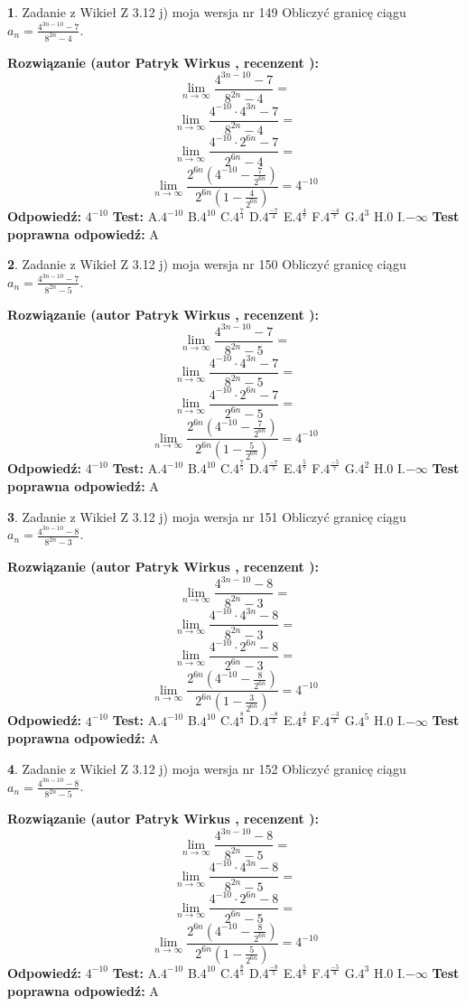 \documentclass[12pt, a4paper]{article}
\theoremstyle{definition} %
\newtheorem{zad}{}
\newcommand{\zadStart}[1]{\begin{zad}#1\newline}
\newcommand{\zadStop}{\end{zad}}
\newcommand{\rozwStart}[2]{\noindent \textbf{Rozwiązanie (autor #1 , recenzent #2): }\newline}
\newcommand{\rozwStop}{\newline}
\newcommand{\odpStart}{\noindent \textbf{Odpowiedź:}\newline}
\newcommand{\odpStop}{\newline}
\newcommand{\testStart}{\noindent \textbf{Test:}\newline}
\newcommand{\testStop}{\newline}
\newcommand{\kluczStart}{\noindent \textbf{Test poprawna odpowiedź:}\newline}
\newcommand{\kluczStop}{\newline}
\begin{document}
\zadStart{Zadanie z Wikieł Z 3.12 j) moja wersja nr 149}
Obliczyć granicę ciągu $a_{n}=\frac{4^{3n-10}-7}{8^{2n}-4}$.
\zadStop
\rozwStart{Patryk Wirkus}{}
$$\lim\limits_{n\to\infty}\frac{4^{3n-10}-7}{8^{2n}-4}=$$
$$\lim\limits_{n\to\infty}\frac{4^{-10} \cdot 4^{3n}-7}{8^{2n}-4}=$$
$$\lim\limits_{n\to\infty}\frac{4^{-10} \cdot 2^{6n}-7}{2^{6n}-4}=$$
$$\lim\limits_{n\to\infty}\frac{2^{6n}(4^{-10} - \frac{7}{2^{6n}})}{2^{6n}(1-\frac{4}{2^{6n}})}= 4^{-10}$$
\rozwStop
\odpStart
$4^{-10}$
\odpStop
\testStart
A.$4^{-10}$
B.$4^{10}$
C.$4^{\frac{7}{4}}$
D.$4^{\frac{-7}{4}}$
E.$4^{\frac{4}{7}}$
F.$4^{\frac{-4}{7}}$
G.$4^{3}$
H.$0$
I.$-\infty$
\testStop
\kluczStart
A
\kluczStop



\zadStart{Zadanie z Wikieł Z 3.12 j) moja wersja nr 150}
Obliczyć granicę ciągu $a_{n}=\frac{4^{3n-10}-7}{8^{2n}-5}$.
\zadStop
\rozwStart{Patryk Wirkus}{}
$$\lim\limits_{n\to\infty}\frac{4^{3n-10}-7}{8^{2n}-5}=$$
$$\lim\limits_{n\to\infty}\frac{4^{-10} \cdot 4^{3n}-7}{8^{2n}-5}=$$
$$\lim\limits_{n\to\infty}\frac{4^{-10} \cdot 2^{6n}-7}{2^{6n}-5}=$$
$$\lim\limits_{n\to\infty}\frac{2^{6n}(4^{-10} - \frac{7}{2^{6n}})}{2^{6n}(1-\frac{5}{2^{6n}})}= 4^{-10}$$
\rozwStop
\odpStart
$4^{-10}$
\odpStop
\testStart
A.$4^{-10}$
B.$4^{10}$
C.$4^{\frac{7}{5}}$
D.$4^{\frac{-7}{5}}$
E.$4^{\frac{5}{7}}$
F.$4^{\frac{-5}{7}}$
G.$4^{2}$
H.$0$
I.$-\infty$
\testStop
\kluczStart
A
\kluczStop



\zadStart{Zadanie z Wikieł Z 3.12 j) moja wersja nr 151}
Obliczyć granicę ciągu $a_{n}=\frac{4^{3n-10}-8}{8^{2n}-3}$.
\zadStop
\rozwStart{Patryk Wirkus}{}
$$\lim\limits_{n\to\infty}\frac{4^{3n-10}-8}{8^{2n}-3}=$$
$$\lim\limits_{n\to\infty}\frac{4^{-10} \cdot 4^{3n}-8}{8^{2n}-3}=$$
$$\lim\limits_{n\to\infty}\frac{4^{-10} \cdot 2^{6n}-8}{2^{6n}-3}=$$
$$\lim\limits_{n\to\infty}\frac{2^{6n}(4^{-10} - \frac{8}{2^{6n}})}{2^{6n}(1-\frac{3}{2^{6n}})}= 4^{-10}$$
\rozwStop
\odpStart
$4^{-10}$
\odpStop
\testStart
A.$4^{-10}$
B.$4^{10}$
C.$4^{\frac{8}{3}}$
D.$4^{\frac{-8}{3}}$
E.$4^{\frac{3}{8}}$
F.$4^{\frac{-3}{8}}$
G.$4^{5}$
H.$0$
I.$-\infty$
\testStop
\kluczStart
A
\kluczStop



\zadStart{Zadanie z Wikieł Z 3.12 j) moja wersja nr 152}
Obliczyć granicę ciągu $a_{n}=\frac{4^{3n-10}-8}{8^{2n}-5}$.
\zadStop
\rozwStart{Patryk Wirkus}{}
$$\lim\limits_{n\to\infty}\frac{4^{3n-10}-8}{8^{2n}-5}=$$
$$\lim\limits_{n\to\infty}\frac{4^{-10} \cdot 4^{3n}-8}{8^{2n}-5}=$$
$$\lim\limits_{n\to\infty}\frac{4^{-10} \cdot 2^{6n}-8}{2^{6n}-5}=$$
$$\lim\limits_{n\to\infty}\frac{2^{6n}(4^{-10} - \frac{8}{2^{6n}})}{2^{6n}(1-\frac{5}{2^{6n}})}= 4^{-10}$$
\rozwStop
\odpStart
$4^{-10}$
\odpStop
\testStart
A.$4^{-10}$
B.$4^{10}$
C.$4^{\frac{8}{5}}$
D.$4^{\frac{-8}{5}}$
E.$4^{\frac{5}{8}}$
F.$4^{\frac{-5}{8}}$
G.$4^{3}$
H.$0$
I.$-\infty$
\testStop
\kluczStart
A
\kluczStop
\end{document}
